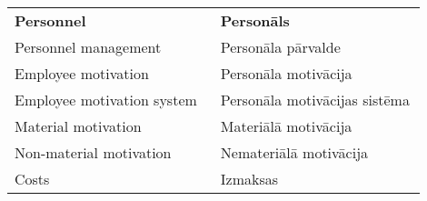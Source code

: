 \frontmatterpage
{}
\begin{tabular}{p{0.45\linewidth}p{0.45\linewidth}}
\textbf{Personnel} & \textbf{Personāls}\\
Personnel management & Personāla pārvalde\\
Employee motivation & Personāla motivācija\\
Employee motivation system & Personāla motivācijas sistēma\\
Material motivation & Materiālā motivācija\\
Non-material motivation & Nemateriālā motivācija\\
Costs & Izmaksas\\
\end{tabular}
\clearpage
